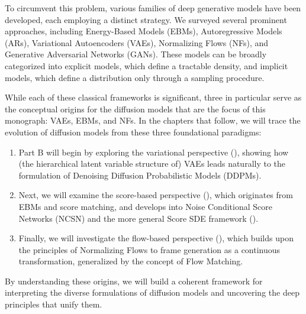 To circumvent this problem, various families of deep generative models have been developed, each employing a distinct strategy. We surveyed several prominent approaches, including Energy-Based Models (EBMs), Autoregressive Models (ARs), Variational Autoencoders (VAEs), Normalizing Flows (NFs), and Generative Adversarial Networks (GANs). These models can be broadly categorized into explicit models, which define a tractable density, and implicit models, which define a distribution only through a sampling procedure.





While each of these classical frameworks is significant, three in particular serve as the conceptual origins for the diffusion models that are the focus of this monograph: VAEs, EBMs, and NFs. In the chapters that follow, we will trace the evolution of diffusion models from these three foundational paradigms:
\begin{enumerate}
    \item Part B will begin by exploring the variational perspective (), showing how (the hierarchical latent variable structure of) VAEs leads naturally to the formulation of Denoising Diffusion Probabilistic Models (DDPMs).
    \item Next, we will examine the score-based perspective (), which originates from EBMs and score matching, and develops into Noise Conditional Score Networks (NCSN) and the more general Score SDE framework ().
    \item Finally, we will investigate the flow-based perspective (), which builds upon the principles of Normalizing Flows to frame generation as a continuous transformation, generalized by the concept of Flow Matching.
\end{enumerate}

By understanding these origins, we will build a coherent framework for interpreting the diverse formulations of diffusion models and uncovering the deep principles that unify them.

